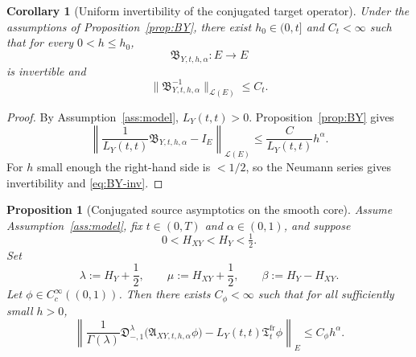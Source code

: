 \documentclass[11pt,a4paper]{amsart}
\theoremstyle{plain}
\newtheorem{proposition}[theorem]{Proposition}
\newtheorem{corollary}[theorem]{Corollary}
\theoremstyle{definition}
\theoremstyle{remark}
\begin{document}
\begin{corollary}[Uniform invertibility of the conjugated target operator]
\label{cor:BY-invertible}
Under the assumptions of Proposition~\ref{prop:BY}, there exist \(h_0\in(0,t]\) and
\(C_t<\infty\) such that for every \(0<h\le h_0\),
\[
\mathfrak B_{Y,t,h,\alpha}:E\to E
\]
is invertible and
\begin{equation}\label{eq:BY-inv}
\|\mathfrak B_{Y,t,h,\alpha}^{-1}\|_{\mathcal L(E)}\le C_t.
\end{equation}
\end{corollary}

\begin{proof}
By Assumption~\ref{ass:model}, \(L_Y(t,t)>0\). Proposition~\ref{prop:BY} gives
\[
\left\|
\frac{1}{L_Y(t,t)}\mathfrak B_{Y,t,h,\alpha}-I_E
\right\|_{\mathcal L(E)}
\le
\frac{C}{L_Y(t,t)}h^\alpha.
\]
For \(h\) small enough the right-hand side is \(<1/2\), so the Neumann series gives
invertibility and \eqref{eq:BY-inv}.
\end{proof}

\begin{proposition}[Conjugated source asymptotics on the smooth core]
\label{prop:q-smooth}
Assume Assumption~\ref{ass:model}, fix \(t\in(0,T)\) and \(\alpha\in(0,1)\), and suppose
\[
0<H_{XY}<H_Y<\tfrac12.
\]
Set
\[
\lambda:=H_Y+\frac12,
\qquad
\mu:=H_{XY}+\frac12,
\qquad
\beta:=H_Y-H_{XY}.
\]
Let \(\phi\in C_c^\infty((0,1))\). Then there exists \(C_\phi<\infty\) such that for all
sufficiently small \(h>0\),
\begin{equation}\label{eq:q-smooth}
\left\|
\frac{1}{\Gamma(\lambda)}
\mathfrak D_{-,1}^{\lambda}\bigl(\mathfrak A_{XY,t,h,\alpha}\phi\bigr)
-L_Y(t,t)\mathfrak T_t^{\mathrm{fr}}\phi
\right\|_E
\le
C_\phi h^\alpha.
\end{equation}
\end{proposition}
\end{document}
